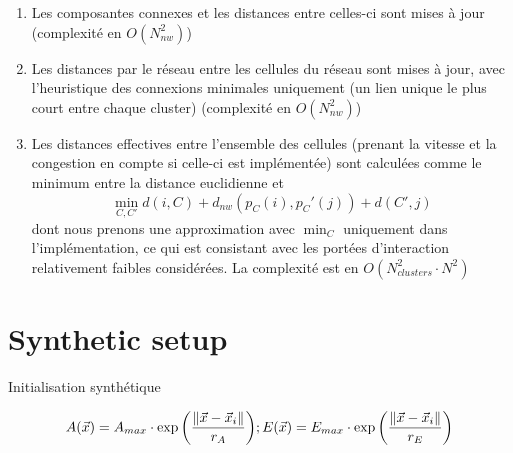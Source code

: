{\begin{enumerate}
	\item Les composantes connexes et les distances entre celles-ci sont mises à jour (complexité en $O(N_{nw}^2)$)
	\item Les distances par le réseau entre les cellules du réseau sont mises à jour, avec l'heuristique des connexions minimales uniquement (un lien unique le plus court entre chaque cluster) (complexité en $O(N_{nw}^2)$)
	\item Les distances effectives entre l'ensemble des cellules (prenant la vitesse et la congestion en compte si celle-ci est implémentée) sont calculées comme le minimum entre la distance euclidienne et 
	\[\min_{C,C'}{d(i,C)+d_{nw}(p_C(i),p_C'(j))+d(C',j)}\]
	dont nous prenons une approximation avec $\min_C$ uniquement dans l'implémentation, ce qui est consistant avec les portées d'interaction relativement faibles considérées. La complexité est en $O(N_{clusters}^2\cdot N^2)$
\end{enumerate}
}




\section{Synthetic setup}{Initialisation synthétique}




\[
A(\vec{x}) = A_{max} \cdot \exp{\left(\frac{\| \vec{x}-\vec{x}_i \|}{r_A}\right)} ; 
E(\vec{x}) = E_{max} \cdot \exp{\left(\frac{\| \vec{x}-\vec{x}_i \|}{r_E}\right)}
\]
















